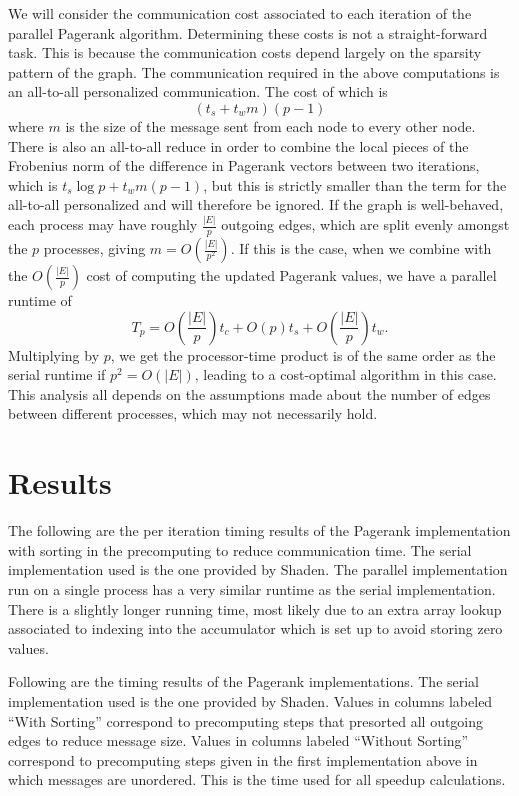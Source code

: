 \documentclass[a4paper]{article}
\begin{document}
We will consider the communication cost associated to each iteration of the parallel Pagerank algorithm. Determining these costs is not a straight-forward task. This is because the communication
costs depend largely on the sparsity pattern of the graph. The communication required in the above computations is an all-to-all personalized
communication. The cost of which is
\[ (t_s + t_w m) (p - 1) \]
where $m$ is the size of the message sent from each node to every other node. There is also an all-to-all reduce in order to combine the local pieces
of the Frobenius norm of the difference in Pagerank vectors between two iterations, which is $t_s \log p + t_w m (p-1)$, but this is strictly smaller
than the term for the all-to-all personalized and will therefore be ignored. If the graph is well-behaved, each process may have roughly
$\frac{|E|}{p}$ outgoing edges, which are split evenly amongst the $p$ processes, giving $m = O \left( \frac{|E|}{p^2} \right)$. If this is the case,
when we combine with the $O \left( \frac{|E|}{p} \right)$ cost of computing the updated Pagerank values, we have a parallel runtime of
\[ T_p = O \left( \frac{|E|}{p} \right) t_c + O(p) t_s + O \left( \frac{|E|}{p} \right) t_w .\]
Multiplying by $p$, we get the processor-time product is of the same order as the serial runtime if $p^2 = O(|E|)$, leading to a cost-optimal
algorithm in this case. This analysis all depends on the assumptions made about the number of edges between different processes, which may not
necessarily hold.


\section{Results}

The following are the per iteration timing results of the Pagerank implementation with sorting in the precomputing to reduce communication time. The
serial implementation used is the one provided by Shaden. The parallel implementation run on a single process has a very similar runtime as the serial
implementation. There is a slightly longer running time, most likely due to an extra array lookup associated to indexing into the accumulator which
is set up to avoid storing zero values.



Following are the timing results of the Pagerank implementations. The serial implementation used is the one provided by Shaden. Values in columns
labeled ``With Sorting'' correspond to precomputing steps that presorted all outgoing edges to reduce message size. Values in columns labeled
``Without Sorting'' correspond to precomputing steps given in the first implementation above in which messages are unordered. This is the time used
for all speedup calculations.
\end{document}
